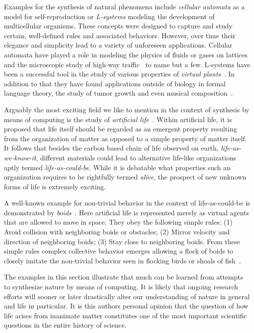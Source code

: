 		Examples for the synthesis of natural phenomena include \emph{cellular automata} as a model for self-reproduction or \emph{L-systems} modeling the development of multicellular organisms. These concepts were designed to capture and study certain, well-defined rules and associated behaviors. However, over time their elegance and simplicity lead to a variety of unforeseen applications. Cellular automata have played a role in modeling the physics of fluids or gases on lattices~\cite{rothman2004lattice} and the microscopic study of high-way traffic~\cite{nagel1998two} to name but a few. L-systems have been a successful tool in the study of various properties of \emph{virtual plants}~\cite{tardieu2003virtual}. In addition to that they have found applications outside of biology in formal language theory, the study of tumor growth and even musical composition~\cite{de2005natural}.

		Arguably the most exciting field we like to mention in the context of synthesis by means of computing is the study of \emph{artificial life}~\cite{Langton:1995:ALO:526815}. Within artificial life, it is proposed that life itself should be regarded as an emergent property resulting from the organization of matter as opposed to a simple property of matter itself. It follows that besides the carbon based chain of life observed on earth, \ie \emph{life-as-we-know-it}, different materials could lead to alternative life-like organizations aptly termed \emph{life-as-could-be}. While it is debatable what properties such an organization requires to be rightfully termed \emph{alive}, the prospect of new unknown forms of life is extremely exciting. 

		A well-known example for non-trivial behavior in the context of life-as-could-be is demonstrated by \emph{boids}~\cite{Reynolds:1987:FHS:37401.37406}. Here artificial life is represented merely as virtual agents that are allowed to move in space. They obey the following simple rules: (1) Avoid collision with neighboring boids or obstacles; (2) Mirror velocity and direction of neighboring boids; (3) Stay close to neighboring boids. From these simple rules complex collective behavior emerges allowing a flock of boids to closely imitate the non-trivial behavior seen in flocking birds or shoals of fish~\cite{de2007fundamentals}.

		The examples in this section illustrate that much can be learned from attempts to synthesize nature by means of computing. It is likely that ongoing research efforts will sooner or later drastically alter our understanding of nature in general and life in particular. It is this authors personal opinion that the question of how life arises from inanimate matter constitutes one of the most important scientific questions in the entire history of science.

